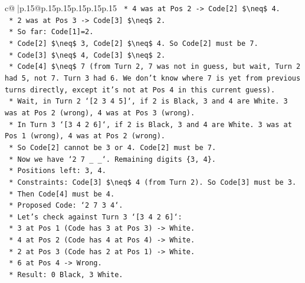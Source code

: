 \documentclass{article}
\begin{document}
{\begin{supertabular}{c@{$\;$}|p{.15\linewidth}@{}p{.15\linewidth}p{.15\linewidth}p{.15\linewidth}p{.15\linewidth}p{.15\linewidth}}
{{{\texttt{                *   4 was at Pos 2 {-}> Code{[}2{]} \$\textbackslash{}neq\$ 4.} \\
\texttt{                *   2 was at Pos 3 {-}> Code{[}3{]} \$\textbackslash{}neq\$ 2.} \\
\texttt{        *   So far: Code{[}1{]}=2.} \\
\texttt{            *   Code{[}2{]} \$\textbackslash{}neq\$ 3, Code{[}2{]} \$\textbackslash{}neq\$ 4. So Code{[}2{]} must be 7.} \\
\texttt{            *   Code{[}3{]} \$\textbackslash{}neq\$ 4, Code{[}3{]} \$\textbackslash{}neq\$ 2.} \\
\texttt{            *   Code{[}4{]} \$\textbackslash{}neq\$ 7 (from Turn 2, 7 was not in guess, but wait, Turn 2 had 5, not 7. Turn 3 had 6. We don't know where 7 is yet from previous turns directly, except it's not at Pos 4 in this current guess).} \\
\texttt{            *   Wait, in Turn 2 `{[}2 3 4 5{]}`, if 2 is Black, 3 and 4 are White. 3 was at Pos 2 (wrong), 4 was at Pos 3 (wrong).} \\
\texttt{            *   In Turn 3 `{[}3 4 2 6{]}`, if 2 is Black, 3 and 4 are White. 3 was at Pos 1 (wrong), 4 was at Pos 2 (wrong).} \\
\texttt{            *   So Code{[}2{]} cannot be 3 or 4. Code{[}2{]} must be 7.} \\
\texttt{            *   Now we have `2 7 \_ \_`. Remaining digits \{3, 4\}.} \\
\texttt{            *   Positions left: 3, 4.} \\
\texttt{            *   Constraints: Code{[}3{]} \$\textbackslash{}neq\$ 4 (from Turn 2). So Code{[}3{]} must be 3.} \\
\texttt{            *   Then Code{[}4{]} must be 4.} \\
\texttt{            *   Proposed Code: `2 7 3 4`.} \\
\texttt{            *   Let's check against Turn 3 `{[}3 4 2 6{]}`:} \\
\texttt{                *   3 at Pos 1 (Code has 3 at Pos 3) {-}> White.} \\
\texttt{                *   4 at Pos 2 (Code has 4 at Pos 4) {-}> White.} \\
\texttt{                *   2 at Pos 3 (Code has 2 at Pos 1) {-}> White.} \\
\texttt{                *   6 at Pos 4 {-}> Wrong.} \\
\texttt{                *   Result: 0 Black, 3 White.} \\
}}}
\end{supertabular}}
\end{document}
